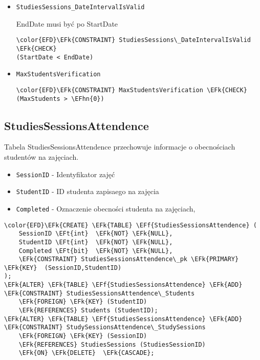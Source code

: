 \documentclass[11pt]{article}
\newcommand{\EFk}[1]{\textcolor{EFk}{\textbf{#1}}} %
\newcommand{\EFf}[1]{\textcolor{EFf}{#1}} %
\newcommand{\EFt}[1]{\textcolor{EFt}{\textbf{#1}}} %
\newcommand{\EFhn}[1]{\textcolor{EFhn}{#1}} %
\begin{document}
\begin{itemize}
\item \texttt{StudiesSessions\_DateIntervalIsValid}

EndDate musi być po StartDate
\begin{Code}
\begin{Verbatim}
\color{EFD}\EFk{CONSTRAINT} StudiesSessions\_DateIntervalIsValid \EFk{CHECK}
(StartDate < EndDate)
\end{Verbatim}
\end{Code}
\item \texttt{MaxStudentsVerification}
\begin{Code}
\begin{Verbatim}
\color{EFD}\EFk{CONSTRAINT} MaxStudentsVerification \EFk{CHECK}
(MaxStudents > \EFhn{0})
\end{Verbatim}
\end{Code}
\end{itemize}
\subsection{StudiesSessionsAttendence}
\label{sec:orgf486b62}
Tabela StudiesSessionsAttendence przechowuje informacje o obecnościach studentów na zajęciach.
\begin{itemize}
\item \texttt{SessionID} - Identyfikator zajęć
\item \texttt{StudentID} - ID studenta zapisaego na zajęcia
\item \texttt{Completed} - Oznaczenie obecności studenta na zajęciach,
\end{itemize}
\begin{Code}
\begin{Verbatim}
\color{EFD}\EFk{CREATE} \EFk{TABLE} \EFf{StudiesSessionsAttendence} (
    SessionID \EFt{int}  \EFk{NOT} \EFk{NULL},
    StudentID \EFt{int}  \EFk{NOT} \EFk{NULL},
    Completed \EFt{bit}  \EFk{NOT} \EFk{NULL},
    \EFk{CONSTRAINT} StudiesSessionsAttendence\_pk \EFk{PRIMARY} \EFk{KEY}  (SessionID,StudentID)
);
\EFk{ALTER} \EFk{TABLE} \EFf{StudiesSessionsAttendence} \EFk{ADD} \EFk{CONSTRAINT} StudiesSessionsAttendence\_Students
    \EFk{FOREIGN} \EFk{KEY} (StudentID)
    \EFk{REFERENCES} Students (StudentID);
\EFk{ALTER} \EFk{TABLE} \EFf{StudiesSessionsAttendence} \EFk{ADD} \EFk{CONSTRAINT} StudySessionsAttendence\_StudySessions
    \EFk{FOREIGN} \EFk{KEY} (SessionID)
    \EFk{REFERENCES} StudiesSessions (StudiesSessionID)
    \EFk{ON} \EFk{DELETE}  \EFk{CASCADE};
\end{Verbatim}
\end{Code}
\end{document}
